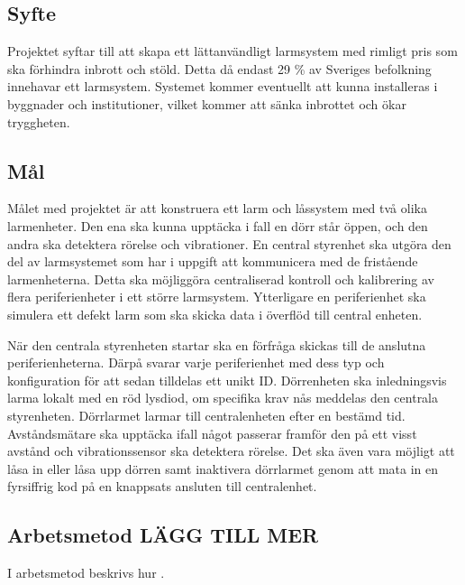 \documentclass{article}
\begin{document}

\subsection{Syfte}
Projektet syftar till att skapa ett lättanvändligt larmsystem med rimligt pris som ska förhindra inbrott och stöld. Detta då endast 29 \% av Sveriges befolkning innehavar ett larmsystem.\cite{SSF} Systemet kommer eventuellt att kunna installeras i byggnader och institutioner, vilket kommer att sänka inbrottet och ökar tryggheten.


\subsection{Mål}
Målet med projektet är att konstruera ett larm och låssystem med två olika larmenheter. Den ena ska kunna upptäcka i fall en dörr står öppen, och den andra ska detektera rörelse och vibrationer. 
En central styrenhet ska utgöra den del av larmsystemet som har i uppgift att kommunicera med de fristående larmenheterna.
Detta ska möjliggöra centraliserad kontroll och kalibrering av flera periferienheter i ett större larmsystem.
Ytterligare en periferienhet ska simulera ett defekt larm som ska skicka data i överflöd till central enheten.

När den centrala styrenheten startar ska en förfråga skickas till de anslutna periferienheterna. Därpå svarar varje periferienhet med dess typ och konfiguration för att sedan tilldelas ett unikt ID. Dörrenheten ska inledningsvis larma lokalt med en röd lysdiod, om specifika krav nås meddelas den centrala styrenheten. Dörrlarmet larmar till centralenheten efter en bestämd tid. Avståndsmätare ska upptäcka ifall något passerar framför den på ett visst avstånd och vibrationssensor ska detektera rörelse. Det ska även vara möjligt att låsa in eller låsa upp dörren samt inaktivera dörrlarmet genom att mata in en fyrsiffrig kod på en knappsats ansluten till centralenhet.


\subsection{Arbetsmetod LÄGG TILL MER }
I arbetsmetod beskrivs hur .
\end{document}
